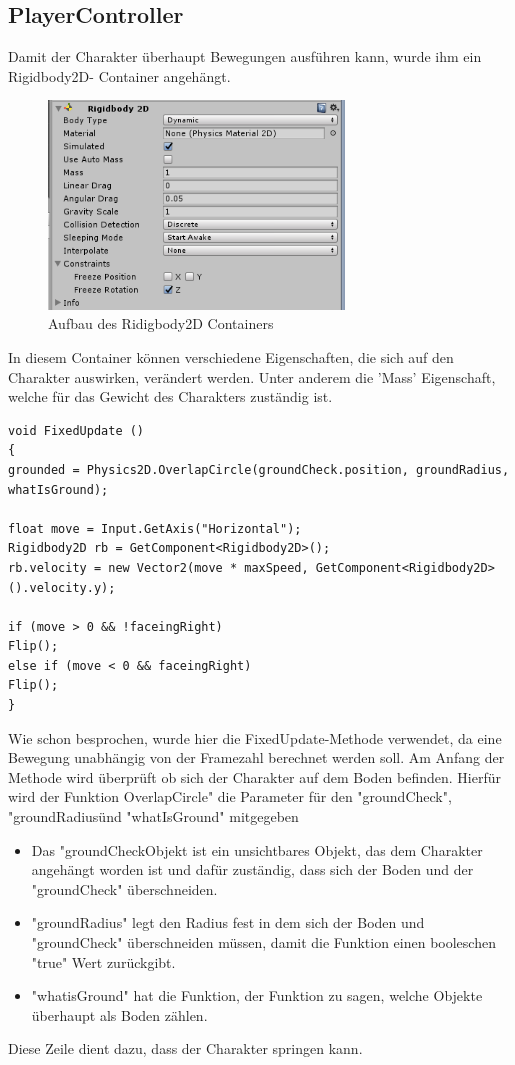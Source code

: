 \subsection{PlayerController}
Damit der Charakter überhaupt Bewegungen ausführen kann, wurde ihm ein Rigidbody2D-
Container angehängt. 

\begin{figure}[htbp] 
	\centering
	\includegraphics[width=0.7\textwidth]{images/Ridigbody2D.png}
	\caption{Aufbau des Ridigbody2D Containers}
\end{figure}
In diesem Container können verschiedene Eigenschaften, die sich auf den Charakter auswirken, verändert werden. Unter anderem die ’Mass’ Eigenschaft, welche für das Gewicht des Charakters zuständig ist.


\begin{lstlisting}[language={[Sharp]C}, caption=Player-Script]
void FixedUpdate ()
{
grounded = Physics2D.OverlapCircle(groundCheck.position, groundRadius, whatIsGround);

float move = Input.GetAxis("Horizontal");
Rigidbody2D rb = GetComponent<Rigidbody2D>();
rb.velocity = new Vector2(move * maxSpeed, GetComponent<Rigidbody2D>().velocity.y);

if (move > 0 && !faceingRight)
Flip();
else if (move < 0 && faceingRight)
Flip();
}
\end{lstlisting}

Wie schon besprochen, wurde hier die FixedUpdate-Methode verwendet, da eine Bewegung unabhängig von der Framezahl berechnet werden soll. Am Anfang der Methode wird überprüft ob sich der Charakter auf dem Boden befinden. Hierfür wird der Funktion OverlapCircle" die Parameter für den "groundCheck", "groundRadiusünd "whatIsGround" mitgegeben
\begin{itemize}
	\item Das "groundCheckObjekt ist ein unsichtbares Objekt, das dem Charakter angehängt worden ist und dafür zuständig, dass sich der Boden und der "groundCheck" überschneiden.
	\item "groundRadius" legt den Radius fest in dem sich der Boden und "groundCheck" überschneiden müssen, damit die Funktion einen booleschen "true" Wert zurückgibt.
	\item "whatisGround" hat die Funktion, der Funktion zu sagen, welche Objekte überhaupt als Boden zählen.
\end{itemize}
Diese Zeile dient dazu, dass der Charakter springen kann.

